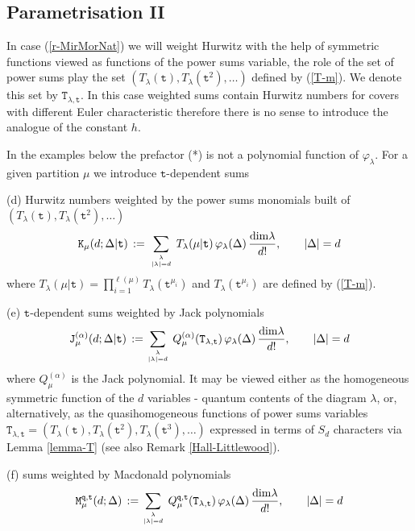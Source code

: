 \documentclass[a4paper,10pt]{article}
\theoremstyle{plain}
\theoremstyle{remark}
\def\be{\begin{equation}}
\def\ee{\end{equation}}
\begin{document}
\subsection{Parametrisation II}
In case (\ref{r-MirMorNat}) we will weight Hurwitz with the help of symmetric functions
viewed as functions of the power sums variable, the role of the set of power sums play the set
$(T_\lambda(\texttt{t}),T_\lambda(\texttt{t}^2),\dots)$
defined by (\ref{T-m}). We denote this set by $\texttt{T}_{\lambda,\texttt{t}}$. In this case weighted sums contain Hurwitz numbers for covers with different Euler characteristic therefore
there is no sense to introduce the analogue of the constant $h$.


 In the examples below the prefactor (*) is not a polynomial function of $\varphi_\lambda$.
For a given  partition $\mu$ we introduce $\texttt{t}$-dependent sums

(d) Hurwitz numbers weighted by the power sums monomials  built of $(T_\lambda(\texttt{t}),T_\lambda(\texttt{t}^2),\dots)$
 \be\label{texttt-T-mu}
 \texttt{K}_{\mu}(d;\Delta|\texttt{t})\,:=\,\sum_{\lambda\atop |\lambda|=d}\,
T_\lambda(\mu|\texttt{t})\, \varphi_\lambda(\Delta)\,\frac{{\rm dim}\lambda}{d!}
,\qquad |\Delta|=d
\ee
where  $T_\lambda(\mu|\texttt{t})=
\prod_{i=1}^{\ell(\mu)} T_\lambda(\texttt{t}^{\mu_i})$ and $T_\lambda(\texttt{t}^{\mu_i})$ are defined by (\ref{T-m}).

(e) $\texttt{t}$-dependent sums weighted by Jack polynomials
\be\label{texttt-J-alpha-t-mu}
 \texttt{J}^{(\alpha)}_{\mu}(d;\Delta|\texttt{t})\,:=
 \sum_{\lambda\atop |\lambda|=d}\,Q^{(\alpha)}_\mu(\texttt{T}_{\lambda,\texttt{t}})
 \, \varphi_\lambda(\Delta)\,\frac{{\rm dim}\lambda}{d!}
,\qquad |\Delta|=d
\ee
where $Q_\mu^{(\alpha)}$ is the Jack polynomial. It may be viewed either as the homogeneous symmetric function of the
$d$ variables - quantum contents of the diagram $\lambda$, or, alternatively, as the quasihomogeneous
functions of power sums variables $\texttt{T}_{\lambda,\texttt{t}} =
\left(T_\lambda(\texttt{t}), T_\lambda(\texttt{t}^2), T_\lambda(\texttt{t}^3),\dots \right)$ expressed in terms of
$S_d$ characters via Lemma \ref{lemma-T} (see also Remark \ref{Hall-Littlewood}).

(f) sums weighted by Macdonald polynomials
\be\label{texttt-M-mu}
 \texttt{M}^{\texttt{q},\texttt{t}}_{\mu}(d;\Delta)\,:=
 \sum_{\lambda\atop |\lambda|=d}\,Q^{\texttt{q},\texttt{t}}_\mu(\texttt{T}_{\lambda,\texttt{t}})
 \, \varphi_\lambda(\Delta)\,\frac{{\rm dim}\lambda}{d!}
,\qquad |\Delta|=d
\ee
\end{document}
